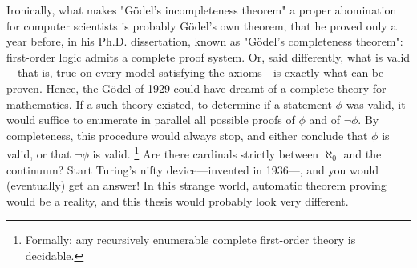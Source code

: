 Ironically, what makes "Gödel's incompleteness theorem" a proper
abomination  for computer scientists is probably Gödel's own theorem, that he proved only a year before, in his
Ph.D. dissertation, known as "Gödel's completeness theorem": 
first-order logic admits a complete proof system. Or, said differently,
what is valid---that is, true on every model satisfying the axioms---is exactly what
can be proven. 
Hence, the Gödel of 1929 could have dreamt of a complete theory for mathematics.
If a such theory existed, to determine if a statement $\phi$ was valid, it would suffice
to enumerate in parallel all possible proofs of $\phi$ and of $\neg \phi$. By completeness, this 
procedure would always stop, and either conclude that $\phi$ is valid, or that
$\neg \phi$ is valid.%
\footnote{Formally: any recursively enumerable complete first-order theory is decidable.}
Are there cardinals strictly between $\aleph_0$ and the continuum?
Start Turing's nifty device---invented in 1936---, and you would (eventually) get an answer! In this strange world, automatic theorem proving would be a reality,
and this thesis would probably look very different.

